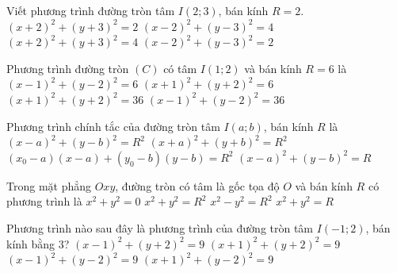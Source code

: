 \begin{ex}%
	Viết phương trình đường tròn tâm $I(2;  3)$, bán kính $R=2$.
	\choice 
		 {$(x+2)^2+(y+3)^2=2$}
		{\True $(x-2)^2+(y-3)^2=4$} 
		{$(x+2)^2+(y+3)^2=4$} 
		{$(x-2)^2+(y-3)^2=2$} 
\end{ex}

\begin{ex}%
	Phương trình đường tròn $\left(C\right)$ có  tâm $I\left(1;2\right)$ và bán kính $R=6$ là
	\choice 
		{$\left(x-1\right)^2+\left(y-2\right)^2=6$} 
		{$\left(x+1\right)^2+\left(y+2\right)^2=6$} 
		 {$\left(x+1\right)^2+\left(y+2\right)^2=36$}
		{\True  $\left(x-1\right)^2+\left(y-2\right)^2=36$}
\end{ex}

\begin{ex}%
	Phương trình chính tắc  của đường tròn tâm $I(a;b)$, bán kính $R$ là
	 \choice
		{\True  $(x-a)^2+(y-b)^2=R^2$}
		{$(x+a)^2+(y+b)^2=R^2$} 
		 {$\left(x_0-a\right)(x-a)+\left(y_0-b\right)(y-b)=R^2$}
		{$(x-a)^2+(y-b)^2=R$} 
\end{ex}

\begin{ex}%
	Trong mặt phẳng $Oxy$, đường tròn có tâm là gốc tọa độ $O$ và bán kính  $R$ có phương trình là
	 \choice
		{$x^2+y^2=0$} 
		{\True $x^2+y^2=R^2$} 
		{$x^2-y^2=R^2$} 
		 {$x^2+y^2=R$}
\end{ex}

\begin{ex}%
	Phương trình nào sau đây  là phương trình của đường tròn tâm $I(-1;2)$, bán kính bằng $3$?
	 \choice
		{$(x-1)^2+(y+2)^2=9$} 
		{$(x+1)^2+(y+2)^2=9$} 
		{$(x-1)^2+(y-2)^2=9$} 
		{$(x+1)^2+(y-2)^2=9$} 
\end{ex}


